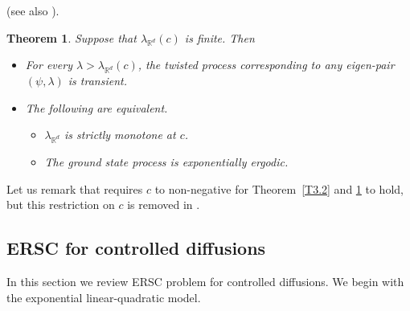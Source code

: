 \documentclass[notitlepage,11pt,reqno]{amsart}
\numberwithin{equation}{section}
\theoremstyle{plain}
\newtheorem{theorem}{Theorem}[section]
\theoremstyle{definition}
\theoremstyle{remark}
\newcommand{\Rd}{{\mathds{R}^{d}}}
\begin{document}
(see also \cite{MR2206349,MR2837506,MR3095206}).
\begin{theorem}\label{T3.3}
Suppose that $\lambda_\Rd(c)$ is finite. Then
\begin{itemize}
\item[(i)] For every $\lambda>\lambda_\Rd(c)$, the twisted process corresponding to any eigen-pair $(\psi, \lambda)$ is transient.
\item[(ii)] The following are equivalent.
\begin{itemize}
\item[(a)] $\lambda_\Rd$ is strictly monotone at $c$.
\item[(b)] The ground state process is exponentially ergodic.
\end{itemize}
\end{itemize}
\end{theorem}
Let us remark that \cite{MR3926044} requires $c$ to non-negative for Theorem~\ref{T3.2} and \ref{T3.3} to hold, but this restriction on $c$ is removed in \cite{ABP2022}.

\subsection{ERSC for controlled diffusions}
In this section we review ERSC problem for controlled diffusions. We begin with the exponential linear-quadratic model.
\end{document}
